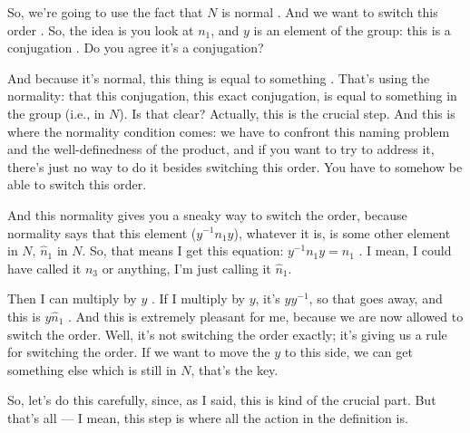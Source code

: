 \begin{proofWrapper}
\begin{speech}[01:01:37 - 01:03:35]
So, we're going to use the fact that $N$ is normal . And we want to switch this order . So, the idea is you look at $n_1$, and $y$ is an element of the group: this is a conjugation . Do you agree it's a conjugation?

And because it's normal, this thing is equal to something . That's using the normality: that this conjugation, this exact conjugation, is equal to something in the group (i.e., in $N$). Is that clear? Actually, this is the crucial step. And this is where the normality condition comes: we have to confront this naming problem and the well-definedness of the product, and if you want to try to address it, there's just no way to do it besides switching this order. You have to somehow be able to switch this order.

And this normality gives you a sneaky way to switch the order, because normality says that this element ($y^{-1} n_1 y$), whatever it is, is some other element in $N$, $\hat{n}_1$ in $N$. So, that means I get this equation: $y^{-1} n_1 y = \hat{n}_1$ . I mean, I could have called it $n_3$ or anything, I'm just calling it $\hat{n}_1$.

Then I can multiply by $y$ . If I multiply by $y$, it's $y y^{-1}$, so that goes away, and this is $y \hat{n}_1$ . And this is extremely pleasant for me, because we are now allowed to switch the order. Well, it's not switching the order exactly; it's giving us a rule for switching the order. If we want to move the $y$ to this side, we can get something else which is still in $N$, that's the key.

So, let's do this carefully, since, as I said, this is kind of the crucial part. But that's all --- I mean, this step is where all the action in the definition is.
\end{speech}

\begin{content}


\end{content}
\end{proofWrapper}
